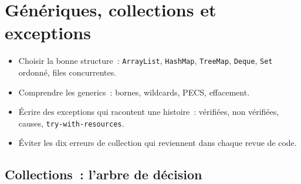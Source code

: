 \documentclass[12pt,a4paper,twoside,openright]{book}
\begin{document}
\chapter{G\'en\'eriques, collections et exceptions}
\label{ch-java-collections}

\begin{objectif}
\begin{itemize}
  \item Choisir la bonne structure~: \verb|ArrayList|, \verb|HashMap|, \verb|TreeMap|, \verb|Deque|,
        \verb|Set| ordonn\'e, files concurrentes.
  \item Comprendre les generics~: bornes, wildcards, PECS, effacement.
  \item \'Ecrire des exceptions qui racontent une histoire~: v\'erifi\'ees, non v\'erifi\'ees, causes,
        \verb|try-with-resources|.
  \item \'Eviter les dix erreurs de collection qui reviennent dans chaque revue de code.
\end{itemize}
\end{objectif}

\section{Collections~: l'arbre de d\'ecision}
\end{document}
